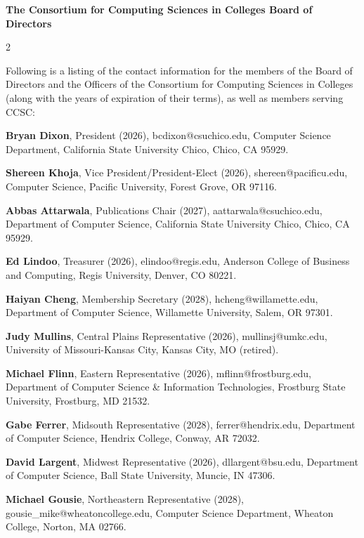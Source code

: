\documentclass{article}
\begin{document}
\begingroup
  \centering
  \textbf{\large The Consortium for Computing Sciences in Colleges Board of Directors\\}
\endgroup

\begin{multicols}{2}
\begin{raggedright}

\small{

\noindent
Following is a listing of the contact information for the members of the Board
of Directors and the Officers of the Consortium for Computing Sciences in
Colleges (along with the years of expiration of their terms), as well as members
serving CCSC:

\noindent
\textbf{Bryan Dixon}, President (2026), bcdixon@csuchico.edu,
Computer Science Department, California State University Chico, Chico, CA 95929.

\noindent
\textbf{Shereen Khoja}, Vice President/President-Elect (2026), shereen@pacificu.edu,
Computer Science, Pacific University, Forest Grove, OR 97116.

\noindent
\textbf{Abbas Attarwala}, Publications Chair (2027), aattarwala@csuchico.edu,
Department of Computer Science, California State University Chico, Chico, CA 95929.

\noindent
\textbf{Ed Lindoo}, Treasurer (2026), elindoo@regis.edu,
Anderson College of Business and Computing, Regis University, Denver, CO 80221.

\noindent
\textbf{Haiyan Cheng}, Membership Secretary (2028), hcheng@willamette.edu,
Department of Computer Science, Willamette University, Salem, OR 97301.

\noindent
\textbf{Judy Mullins}, Central Plains Representative (2026), mullinsj@umkc.edu, University of Missouri-Kansas City, Kansas City, MO (retired).

\noindent
\textbf{Michael Flinn}, Eastern Representative (2026), mflinn@frostburg.edu,
Department of Computer Science \& Information Technologies,
Frostburg State University, Frostburg, MD 21532.

\vspace{10pt}
\noindent
\textbf{Gabe Ferrer}, Midsouth Representative (2028),
ferrer@hendrix.edu, Department of Computer Science, Hendrix College, Conway, AR 72032.

\noindent
\textbf{David Largent}, Midwest Representative (2026), dllargent@bsu.edu,
Department of Computer Science,
Ball State University,
Muncie, IN 47306.

\noindent
\textbf{Michael Gousie}, Northeastern Representative (2028), gousie\_mike@wheatoncollege.edu, Computer Science Department, Wheaton College, Norton, MA 02766.

}
\end{raggedright}
\end{multicols}
\end{document}
